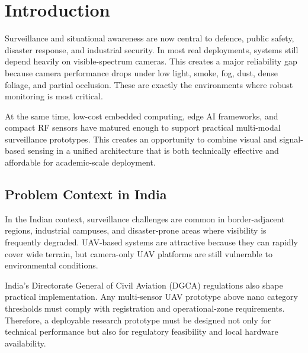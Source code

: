 \chapter{Introduction}
\label{Introduction}

Surveillance and situational awareness are now central to defence, public safety, disaster response, and industrial security. In most real deployments, systems still depend heavily on visible-spectrum cameras. This creates a major reliability gap because camera performance drops under low light, smoke, fog, dust, dense foliage, and partial occlusion. These are exactly the environments where robust monitoring is most critical.

At the same time, low-cost embedded computing, edge AI frameworks, and compact RF sensors have matured enough to support practical multi-modal surveillance prototypes. This creates an opportunity to combine visual and signal-based sensing in a unified architecture that is both technically effective and affordable for academic-scale deployment.

\section{Problem Context in India}
In the Indian context, surveillance challenges are common in border-adjacent regions, industrial campuses, and disaster-prone areas where visibility is frequently degraded. UAV-based systems are attractive because they can rapidly cover wide terrain, but camera-only UAV platforms are still vulnerable to environmental conditions.

India's Directorate General of Civil Aviation (DGCA) regulations also shape practical implementation. Any multi-sensor UAV prototype above nano category thresholds must comply with registration and operational-zone requirements. Therefore, a deployable research prototype must be designed not only for technical performance but also for regulatory feasibility and local hardware availability.

